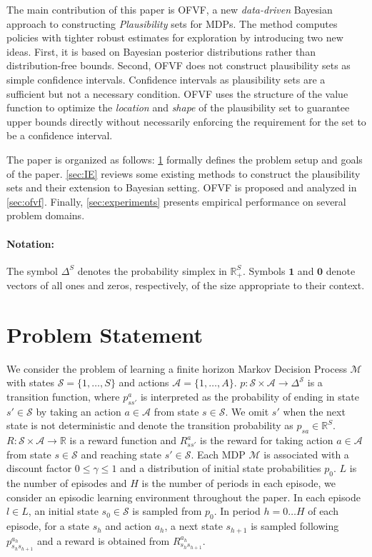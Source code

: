 \documentclass{article}
\newcommand{\one}{\mathbf{1}}
\newcommand{\Real}{\mathbb{R}}
\newcommand{\zero}{\mathbf{0}}
\newcommand{\states}{\mathcal{S}}
\newcommand{\actions}{\mathcal{A}}
\newcommand{\mdp}{\mathcal{M}}
\newcommand{\statecount}{S}
\theoremstyle{plain}
\theoremstyle{definition}
\begin{document}
The main contribution of this paper is OFVF, a new \emph{data-driven} Bayesian approach to constructing \emph{Plausibility} sets for MDPs. The method computes policies with tighter robust estimates for exploration by introducing two new ideas. First, it is based on Bayesian posterior distributions rather than distribution-free bounds. Second, OFVF does not construct plausibility sets as simple confidence intervals. Confidence intervals as plausibility sets are a sufficient but not a necessary condition. OFVF uses the structure of the value function to optimize the \emph{location} and \emph{shape} of the plausibility set to guarantee upper bounds directly without necessarily enforcing the requirement for the set to be a confidence interval.

The paper is organized as follows: \cref{sec:prbolem} formally defines the problem setup and goals of the paper. \cref{sec:IE} reviews some existing methods to construct the plausibility sets and their extension to Bayesian setting. OFVF is proposed and analyzed in \cref{sec:ofvf}. Finally, \cref{sec:experiments} presents empirical performance on several problem domains.

\paragraph{Notation:} The symbol $\Delta^\statecount$ denotes the probability simplex in $\Real_+^\statecount$. Symbols $\one$ and $\zero$ denote vectors of all ones and zeros, respectively, of the size appropriate to their context.

\section{Problem Statement} \label{sec:prbolem}

We consider the problem of learning a finite horizon Markov Decision Process $\mdp$ with states $\states = \{1, \ldots, S \}$ and actions $\actions = \{1, \ldots, A \}$. $p: \states \times \actions \to \Delta^\states$ is a transition function, where $p^a_{ss'}$ is interpreted as the probability of ending in state $s'\in\states$ by taking an action $a\in\actions$ from state $s\in\states$. We omit $s'$ when the next state is not deterministic and denote the transition probability as $p_{sa}\in\Real^S$. $R: \states \times \actions \to \Real$ is a reward function and $R^a_{ss'}$ is the reward for taking action $a\in\actions$ from state $s\in\states$ and reaching state $s'\in\states$. Each MDP $\mdp$ is associated with a discount factor $0\le\gamma\le1$ and a distribution of initial state probabilities $p_0$. $L$ is the number of episodes and $H$ is the number of periods in each episode, we consider an episodic learning environment throughout the paper. In each episode $l\in L$, an initial state $s_0\in\states$ is sampled from $p_0$. In period $h=0\ldots H$ of each episode, for a state $s_h$ and action $a_h$, a next state $s_{h+1}$ is sampled following $p^{a_h}_{s_hs_{h+1}}$ and a reward is obtained from $R^{a_h}_{s_hs_{h+1}}$.
\end{document}
